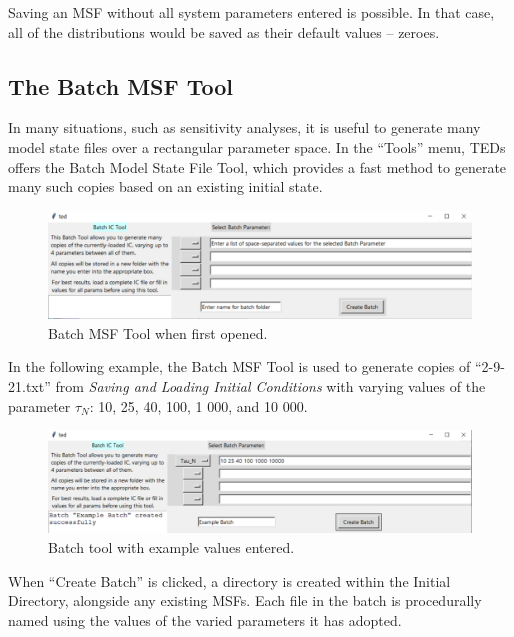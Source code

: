 \documentclass[11pt,letterpaper,titlepage]{article}
\begin{document}
		\par Saving an MSF without all system parameters entered is possible. In that case, all of the distributions would be saved as their default values – zeroes.
		
		\subsection{The Batch MSF Tool}
		
		\par In many situations, such as sensitivity analyses, it is useful to generate many model state files over a rectangular parameter space. In the “Tools” menu, TEDs offers the Batch Model State File Tool, which provides a fast method to generate many such copies based on an existing initial state.
		
		\begin{figure}[H]
			\label{fig:save_menu}
			\centering
			\includegraphics[scale=1]{"batch_blank"}
			\caption{Batch MSF Tool when first opened.}
		\end{figure}
	
		\par In the following example, the Batch MSF Tool is used to generate copies of “2-9-21.txt” from \textit{Saving and Loading Initial Conditions} with varying values of the parameter $\tau_{N}$: 10, 25, 40, 100, 1 000, and 10 000.
	
		\begin{figure}[H]
			\label{fig:batch_example}
			\centering
			\includegraphics[scale=1]{"batch_example"}
			\caption{Batch tool with example values entered.}
		\end{figure}
	
		\par When “Create Batch” is clicked, a directory is created within the Initial Directory, alongside any existing MSFs. Each file in the batch is procedurally named using the values of the varied parameters it has adopted.
		
\end{document}
